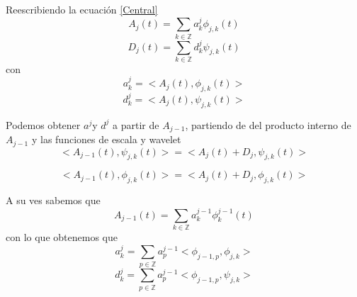 \documentclass{beamer}
\begin{document}
   \begin{frame}

Reescribiendo la ecuación \ref{Central} 
   \begin{equation}
\label{Aj}
A_j(t)=\sum_{k \in \mathbb Z}  a^{j}_{k} \phi _{j,k}(t)
\end{equation} 
\begin{equation}
\label{Dj}
D_j(t)=\sum_{k \in \mathbb Z}  d^{j}_{k} \psi _{j,k}(t)
\end{equation} 
con
\begin{equation}
\label{ajk}
a^{j}_{k}= <A_{j}(t), \phi _{j,k}(t)>
\end{equation}
\begin{equation}
\label{ajk}
d^{j}_{k}= <A_{j}(t), \psi _{j,k}(t)>
\end{equation}
    \end{frame}
    
  \begin{frame}
   Podemos obtener $a^{j}$y $d^{j}$ a partir de $A_{j-1}$, partiendo de del 	producto interno de $A_{j-1}$ y las funciones de escala y wavelet
   \begin{equation}
<A_{j-1}(t),\psi _{j,k}(t)>=<A_{j}(t)+D_{j},\psi _{j,k}(t)>
\end{equation}

\begin{equation}
<A_{j-1}(t),\phi _{j,k}(t)>=<A_{j}(t)+D_{j},\phi _{j,k}(t)>
\end{equation}
  \end{frame}
  
  \begin{frame}
  A su ves sabemos que 
  \begin{equation}
  A_{j-1}(t)=\sum_{k \in \mathbb{Z}} a^{j-1}_{k} \phi^{j-1}_{k}(t)
  \end{equation}
  con lo que obtenemos que 
  \begin{equation}
  a^{j}_{k}=\sum_{p \in \mathbb{Z}} a^{j-1}_{p} <\phi_{j-1,p},\phi_{j,k}>
  \end{equation}
  \begin{equation}
  d^{j}_{k}=\sum_{p \in \mathbb{Z}} a^{j-1}_{p} <\phi_{j-1,p},\psi_{j,k}>
  \end{equation}
  \end{frame}
  
\end{document}
